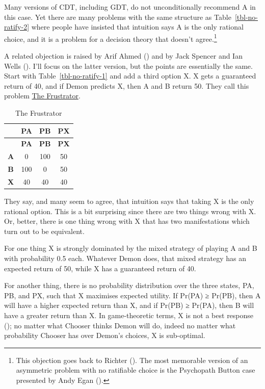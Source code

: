 \documentclass[
  12pt,
  letterpaper,
  DIV=11,
  numbers=noendperiod]{scrreprt}
\begin{document}
Many versions of CDT, including GDT, do not unconditionally recommend A
in this case. Yet there are many problems with the same structure as
Table~\ref{tbl-no-ratify-2} where people have insisted that intuition
says A is the only rational choice, and it is a problem for a decision
theory that doesn't agree.\footnote{This objection goes back to Richter
  (). The most memorable version of an
  asymmetric problem with no ratifiable choice is the Psychopath Button
  case presented by Andy Egan ().}

A related objection is raised by Arif Ahmed
() and by Jack Spencer and Ian Wells
(). I'll focus on the latter
version, but the points are essentially the same. Start with
Table~\ref{tbl-no-ratify-1} and add a third option X. X gets a
guaranteed return of 40, and if Demon predicts X, then A and B return
50. They call this problem \hyperref[tbl-frustrator]{The Frustrator}.

\begin{longtable}[]{@{}cccc@{}}
\caption{The Frustrator}\label{tbl-frustrator}\tabularnewline
\toprule\noalign{}
& \textbf{PA} & \textbf{PB} & \textbf{PX} \\
\midrule\noalign{}
\endfirsthead
\toprule\noalign{}
& \textbf{PA} & \textbf{PB} & \textbf{PX} \\
\midrule\noalign{}
\endhead
\bottomrule\noalign{}
\endlastfoot
\textbf{A} & 0 & 100 & 50 \\
\textbf{B} & 100 & 0 & 50 \\
\textbf{X} & 40 & 40 & 40 \\
\end{longtable}

They say, and many seem to agree, that intuition says that taking X is
the only rational option. This is a bit surprising since there are two
things wrong with X. Or, better, there is one thing wrong with X that
has two manifestations which turn out to be equivalent.

For one thing X is strongly dominated by the mixed strategy of playing A
and B with probability 0.5 each. Whatever Demon does, that mixed
strategy has an expected return of 50, while X has a guaranteed return
of 40.

For another thing, there is no probability distribution over the three
states, PA, PB, and PX, such that X maximises expected utility. If
Pr(PA) ≥ Pr(PB), then A will have a higher expected return than X, and
if Pr(PB) ≥ Pr(PA), then B will have a greater return than X. In
game-theoretic terms, X is not a best response
(); no matter what Chooser
thinks Demon will do, indeed no matter what probability Chooser has over
Demon's choices, X is sub-optimal.
\end{document}
